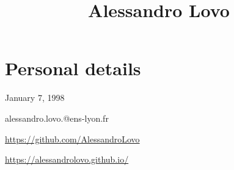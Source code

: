 \documentclass[11pt, a4 paper]{article}
\begin{document}
\title{Alessandro Lovo}
\date{}
\author{}
\maketitle


\section*{Personal details}
  \begin{multicols}{2}
    \begin{description}[style=multiline,leftmargin=2cm,align=right]
      \item[Birth] January 7, 1998
      \item[Email]
        alessandro.lovo.@ens-lyon.fr

      \item[GitHub] {\small \url{https://github.com/AlessandroLovo}}
      \item[Website] {\small \url{https://alessandrolovo.github.io/}}
    \end{description}
  \end{multicols}
\end{document}
